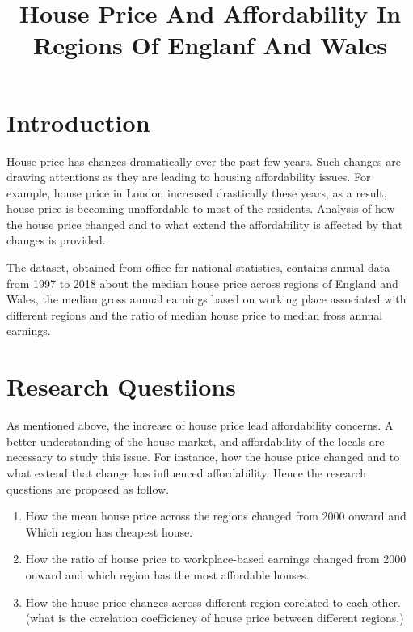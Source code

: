\documentclass{article}
\title{House Price And Affordability In Regions Of Englanf And Wales}
\begin{document}
%
\maketitle
%

\section{Introduction}
House price has changes dramatically over the past few years. Such changes are drawing 
attentions as they are leading to housing affordability issues. For example, house price 
in London increased drastically these years, as a result, house price is becoming unaffordable
to most of the residents. Analysis of how the house price changed and 
to what extend the affordability is affected by that changes is provided.

The dataset, obtained from office for national statistics, contains annual data from 1997 to 2018 about 
the median house price across regions of England and Wales, the median gross annual 
earnings based on working place associated with different regions and the ratio of 
median house price to median fross annual earnings.\cite{henretty_2019} \cite{henretty_data_2019}

\section{Research Questiions}
As mentioned above, the increase of house price lead affordability concerns. A better understanding of 
the house market, and affordability of the locals are necessary to study this issue. For instance, 
how the house price changed and to what extend that change has influenced affordability. Hence 
the research questions are proposed as follow.

\begin{enumerate}
  \item How the mean house price across the regions changed 
  from 2000 onward and Which region has cheapest house.
  \item How the ratio of house price to workplace-based earnings
  changed from 2000 onward and which region has the most affordable
  houses.
  \item How the house price changes across different region corelated
  to each other. (what is the corelation coefficiency of house price between
  different regions.)
\end{enumerate}

\end{document}
